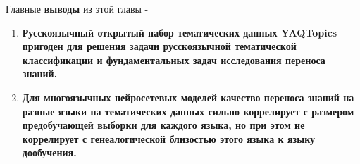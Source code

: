 Главные \textbf{выводы} из этой главы -
\begin{enumerate}
\item \textbf{Русскоязычный открытый набор тематических данных {YAQTopics} пригоден для решения задачи русскоязычной тематической классификации и фундаментальных задач исследования переноса знаний.}
\item \textbf{Для многоязычных нейросетевых моделей качество переноса знаний на разные языки на тематических данных сильно коррелирует с размером предобучающей выборки для каждого языка, но при этом не коррелирует с генеалогической близостью этого языка к языку дообучения.}
\end{enumerate}


 
